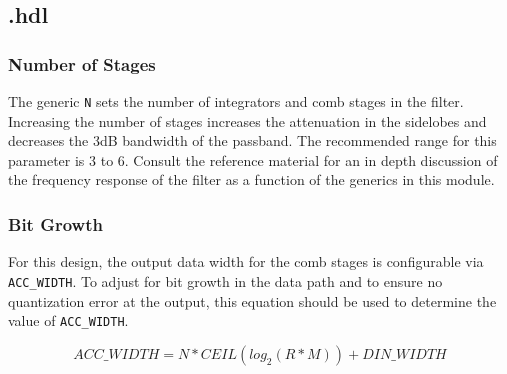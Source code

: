 \subsection*{\comp.hdl}
\subsubsection*{Number of Stages}
\begin{flushleft}
	The generic \verb+N+ sets the number of integrators and comb stages in the filter.	Increasing the number of stages increases the attenuation in the sidelobes and decreases the 3dB bandwidth of the passband. The recommended range for this parameter is 3 to 6. Consult the reference material for an in depth discussion of the frequency response of the filter as a function of the generics in this module.
\end{flushleft}
\subsubsection*{Bit Growth}
\begin{flushleft}
	For this design, the output data width for the comb stages is configurable via	\verb+ACC_WIDTH+. To adjust for bit growth in the data path and to ensure no quantization error at the output, this equation should be used to determine the value of \verb+ACC_WIDTH+.

	\begin{equation} \label{eq:acc_width}
		ACC\_WIDTH = N*CEIL(log_2(R*M))+DIN\_WIDTH
	\end{equation}
\end{flushleft}
